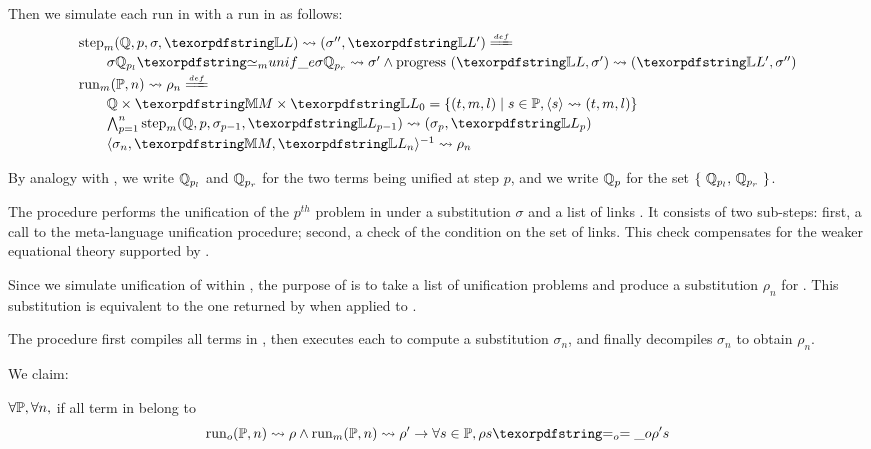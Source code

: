 Then we simulate each run in \Fo{} with a run in \Ho as follows:
%
$$
\begin{array}{l}
\stepH{\hoUnifPb}{p}{\sigma}{\linkStore}{\sigma''}{\linkStore'} \deff\vspace{2pt}\\
  \qquad\stepHD{\hoUnifPb}{p}{\sigma}{\sigma'}{\sigma''}{\linkStore}\vspace{2pt}\\
  \runH{\foUnifPb}{n}{\rho} \deff \vspace{2pt}\\
  \qquad \hoUnifPb \times \mapStore \times \linkStore_0 = \{ (t,m,l) \mid s \in \foUnifPb, \C{s}{t}{m}{l} \}\vspace{2pt}\\
  \qquad \runHD{\hoUnifPb}{n}{\linkStore}\vspace{2pt}\\
  \qquad \D{\sigma_{n}}{\mapStore}{\linkStore_{n}}{\rho_{n}}
\end{array}
$$

\noindent
By analogy with \foUnifPb, we write $\mathbb{Q}_{p_l}$ and $\mathbb{Q}_{p_r}$
for the two \Ho{} terms being unified at step $p$, and we write $\mathbb{Q}_p$
for the set $\{~ \mathbb{Q}_{p_l},\, \mathbb{Q}_{p_r} ~\}$.

The \hstep{} procedure performs the unification of the $p^{th}$
problem in \hoUnifPb under a substitution $\sigma$ and a list of
links \linkStore. It consists of two sub-steps: first, a call to
the meta-language unification procedure; second, a check of the
\progress{} condition on the set of links. This check compensates
for the weaker equational theory supported by \Ue.

Since we simulate unification of \Fo within \Ho, the purpose of
\hrun{} is to take a list of unification problems \foUnifPb and
produce a substitution $\rho_n$ for \Fo. This substitution
is equivalent to the one returned by \frun{} when applied to
\foUnifPb.

The \hrun{} procedure first compiles all terms in \foUnifPb,
then executes each \hstep{} to compute a substitution $\sigma_n$,
and finally decompiles $\sigma_n$ to obtain $\rho_n$.

We claim:

\begin{proposition}\label{prop:simulation} $\forall \mathbb{P},
\forall n,$ if all term in \foUnifPb belong to \llambda
$$
  \runFx{\foUnifPb}{n}{\rho} \land
  \runHx{\foUnifPb}{n}{\rho'}
  \to
  \forall s \in \foUnifPb, \rho s \Eo \rho' s
$$
\end{proposition}

